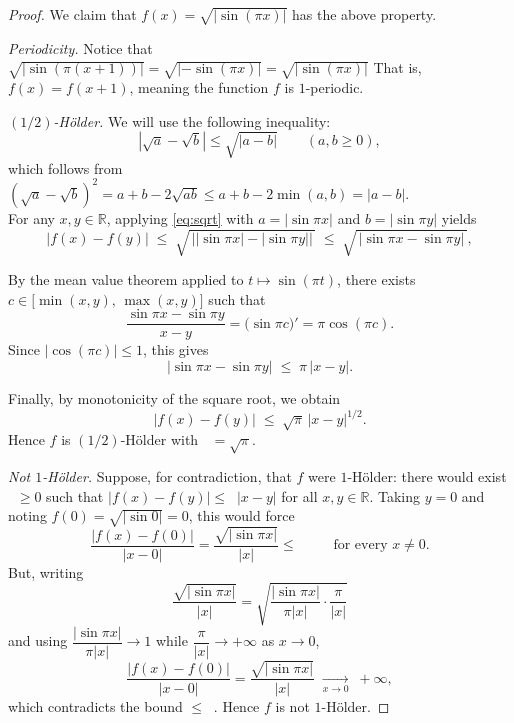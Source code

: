 \documentclass[11pt]{article}
\newcommand{\R}{\mathbb{R}}
\newcommand{\abs}[1]{\left\lvert #1 \right\rvert}
\DeclareMathOperator{\Hf}{H_f}
\begin{document}
\begin{proof}
We claim that $f(x)=\sqrt{\abs{\sin(\pi x)}}$ has the above property.

\smallskip
\emph{Periodicity.} Notice that
\\$\sqrt{\abs{\sin(\pi(x+1))}}=\sqrt{\abs{-\sin(\pi x)}}=\sqrt{\abs{\sin(\pi x)}}$
That is, $f(x) = f(x+1)$, meaning the function
$f$ is $1$-periodic.

\smallskip
\emph{$(1/2)$-H\"older.} We will use the following inequality:
\begin{equation}\label{eq:sqrt}
\abs{\sqrt a-\sqrt b}\le \sqrt{\abs{a-b}}\qquad(a,b\ge 0),
\end{equation}
which follows from 
\\$(\sqrt a-\sqrt b)^2=a+b-2\sqrt{ab}\le a+b-2\min(a,b)=\abs{a-b}$.
\\ For any $x, y \in \mathbb{R}$, applying \eqref{eq:sqrt} with
$a = \abs{\sin \pi x}$ and $b = \abs{\sin \pi y}$ yields
\[
  \abs{f(x) - f(y)}
  \;\le\; \sqrt{\,\bigl\lvert \abs{\sin \pi x} - \abs{\sin \pi y} \bigr\rvert\,}
  \;\le\; \sqrt{\,\abs{\sin \pi x - \sin \pi y}\,},
\]

By the mean value theorem applied to $t \mapsto \sin(\pi t)$, there exists
$c \in \bigl[\min(x,y),\, \max(x,y)\bigr]$ such that
\[
  \frac{\sin \pi x - \sin \pi y}{x - y} = \bigl(\sin \pi c\bigr)' = \pi \cos(\pi c).
\]
Since $\abs{\cos(\pi c)} \le 1$, this gives
\[
  \abs{\sin \pi x - \sin \pi y} \;\le\; \pi\,\abs{x - y}.
\]

Finally, by monotonicity of the square root, we obtain
\[
  \boxed{\;\abs{f(x) - f(y)} \;\le\; \sqrt{\pi}\,\abs{x - y}^{1/2}.\;}
\]
Hence $f$ is $(1/2)$-H\"older with $\Hf=\sqrt\pi$.

\smallskip
\emph{Not $1$-H\"older.} Suppose, for contradiction, that $f$ were $1$-H\"older: there would exist
$\Hf\ge0$ such that $\abs{f(x)-f(y)}\le\Hf\abs{x-y}$ for all $x,y\in\R$. Taking $y=0$ and noting
$f(0)=\sqrt{\abs{\sin 0}}=0$, this would force
\[
\frac{\abs{f(x)-f(0)}}{\abs{x-0}}=\frac{\sqrt{\abs{\sin\pi x}}}{\abs x}\le\Hf
\qquad\text{for every }x\ne0 .
\]
But, writing
\[
\frac{\sqrt{\abs{\sin\pi x}}}{\abs x}
=\sqrt{\frac{\abs{\sin\pi x}}{\pi\abs x}\cdot\frac{\pi}{\abs x}}
\]
and using $\dfrac{\abs{\sin\pi x}}{\pi\abs x}\to1$ while $\dfrac{\pi}{\abs x}\to+\infty$ as $x\to0$,
\[
\frac{\abs{f(x)-f(0)}}{\abs{x-0}}=\frac{\sqrt{\abs{\sin\pi x}}}{\abs x}\;\xrightarrow[x\to0]{}\;+\infty ,
\]
which contradicts the bound $\le\Hf$. Hence $f$ is not $1$-H\"older.
\end{proof}
\end{document}
